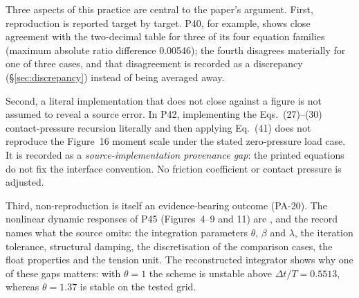 {\leavevmode{} 
Three aspects of this practice are central to the paper's argument. First, reproduction is reported target by target. P40, for example, shows close agreement with the two-decimal table for three of its four equation families (maximum absolute ratio difference 0.00546); the fourth disagrees materially for one of three cases, and that disagreement is recorded as a discrepancy (\S\ref{sec:discrepancy}) instead of being averaged away.\par}

Second, a literal implementation that does not close against a figure is not assumed to reveal a source error. In P42, implementing the Eqs.~(27)--(30) contact-pressure recursion literally and then applying Eq.~(41) does not reproduce the Figure~16 moment scale under the stated zero-pressure load case. It is recorded as a \emph{source-implementation provenance gap}: the printed equations do not fix the interface convention. No friction coefficient or contact pressure is adjusted.

Third, non-reproduction is itself an evidence-bearing outcome (PA-20). The nonlinear dynamic responses of P45 (Figures~4--9 and 11) are , and the record names what the source omits: the integration parameters $\theta$, $\beta$ and $\lambda$, the iteration tolerance, structural damping, the discretisation of the comparison cases, the float properties and the tension unit. The reconstructed integrator shows why one of these gaps matters: with $\theta=1$ the scheme is unstable above $\Delta t/T = 0.5513$, whereas $\theta=1.37$ is stable on the tested grid.
